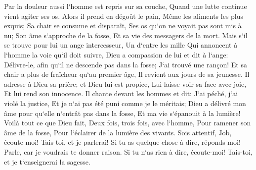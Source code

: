 \verse Par la douleur aussi l`homme est repris sur sa couche, Quand une lutte continue vient agiter ses os. 
\verse Alors il prend en dégoût le pain, Même les aliments les plus exquis; 
\verse Sa chair se consume et disparaît, Ses os qu`on ne voyait pas sont mis à nu; 
\verse Son âme s`approche de la fosse, Et sa vie des messagers de la mort. 
\verse Mais s`il se trouve pour lui un ange intercesseur, Un d`entre les mille Qui annoncent à l`homme la voie qu`il doit suivre, 
\verse Dieu a compassion de lui et dit à l`ange: Délivre-le, afin qu`il ne descende pas dans la fosse; J`ai trouvé une rançon! 
\verse Et sa chair a plus de fraîcheur qu`au premier âge, Il revient aux jours de sa jeunesse. 
\verse Il adresse à Dieu sa prière; et Dieu lui est propice, Lui laisse voir sa face avec joie, Et lui rend son innocence. 
\verse Il chante devant les hommes et dit: J`ai péché, j`ai violé la justice, Et je n`ai pas été puni comme je le méritais; 
\verse Dieu a délivré mon âme pour qu`elle n`entrât pas dans la fosse, Et ma vie s`épanouit à la lumière! 
\verse Voilà tout ce que Dieu fait, Deux fois, trois fois, avec l`homme, 
\verse Pour ramener son âme de la fosse, Pour l`éclairer de la lumière des vivants. 
\verse Sois attentif, Job, écoute-moi! Tais-toi, et je parlerai! 
\verse Si tu as quelque chose à dire, réponds-moi! Parle, car je voudrais te donner raison. 
\verse Si tu n`as rien à dire, écoute-moi! Tais-toi, et je t`enseignerai la sagesse. 

